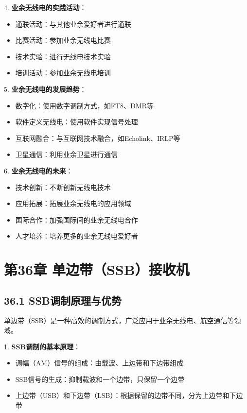 \documentclass[12pt,UTF8]{ctexbook}
\begin{document}
4. \textbf{业余无线电的实践活动}：
   \begin{itemize}[leftmargin=3.5em]
   \item 通联活动：与其他业余爱好者进行通联
   \item 比赛活动：参加业余无线电比赛
   \item 技术实验：进行无线电技术实验
   \item 培训活动：参加业余无线电培训
   \end{itemize}

5. \textbf{业余无线电的发展趋势}：
   \begin{itemize}[leftmargin=3.5em]
   \item 数字化：使用数字调制方式，如FT8、DMR等
   \item 软件定义无线电：使用软件实现信号处理
   \item 互联网融合：与互联网技术融合，如Echolink、IRLP等
   \item 卫星通信：利用业余卫星进行通信
   \end{itemize}

6. \textbf{业余无线电的未来}：
   \begin{itemize}[leftmargin=3.5em]
   \item 技术创新：不断创新无线电技术
   \item 应用拓展：拓展业余无线电的应用领域
   \item 国际合作：加强国际间的业余无线电合作
   \item 人才培养：培养更多的业余无线电爱好者
   \end{itemize}

\chapter*{第36章 单边带（SSB）接收机}
\section*{36.1 SSB调制原理与优势}

单边带（SSB）是一种高效的调制方式，广泛应用于业余无线电、航空通信等领域。

1. \textbf{SSB调制的基本原理}：
   \begin{itemize}[leftmargin=3.5em]
   \item 调幅（AM）信号的组成：由载波、上边带和下边带组成
   \item SSB信号的生成：抑制载波和一个边带，只保留一个边带
   \item 上边带（USB）和下边带（LSB）：根据保留的边带不同，分为上边带和下边带
   \end{itemize}
\end{document}

